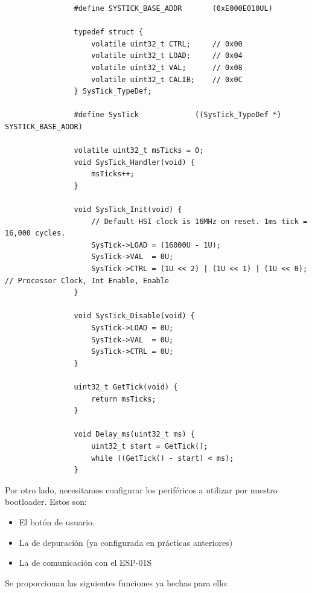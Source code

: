 \documentclass[../main.tex]{subfiles}
\begin{document}
            \begin{lstlisting}
                #define SYSTICK_BASE_ADDR  		(0xE000E010UL)

                typedef struct {
                    volatile uint32_t CTRL;     // 0x00
                    volatile uint32_t LOAD;     // 0x04
                    volatile uint32_t VAL;      // 0x08
                    volatile uint32_t CALIB;    // 0x0C
                } SysTick_TypeDef;

                #define SysTick           	((SysTick_TypeDef *) SYSTICK_BASE_ADDR)

                volatile uint32_t msTicks = 0;
                void SysTick_Handler(void) {
                    msTicks++;
                }

                void SysTick_Init(void) {
                    // Default HSI clock is 16MHz on reset. 1ms tick = 16,000 cycles.
                    SysTick->LOAD = (16000U - 1U);
                    SysTick->VAL  = 0U;
                    SysTick->CTRL = (1U << 2) | (1U << 1) | (1U << 0); // Processor Clock, Int Enable, Enable
                }

                void SysTick_Disable(void) {
                    SysTick->LOAD = 0U;
                    SysTick->VAL  = 0U;
                    SysTick->CTRL = 0U;
                }

                uint32_t GetTick(void) {
                    return msTicks;
                }

                void Delay_ms(uint32_t ms) {
                    uint32_t start = GetTick();
                    while ((GetTick() - start) < ms);
                }
            \end{lstlisting}

            Por otro lado, necesitamos configurar los periféricos a utilizar por nuestro bootloader. Estos son:

            \begin{itemize}
                \item El botón de usuario.
                \item La  de depuración (ya configurada en prácticas anteriores)
                \item La  de comunicación con el ESP-01S
            \end{itemize}

            Se proporcionan las siguientes funciones ya hechas para ello:
\end{document}
